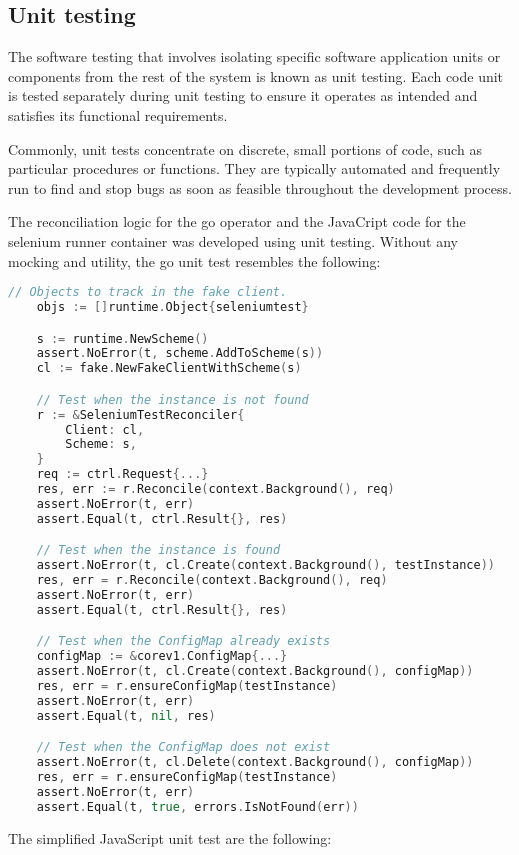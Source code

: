 \subsection{Unit testing}

The software testing that involves isolating specific software application units or components from the rest of the system is known as unit testing. Each code unit is tested separately during unit testing to ensure it operates as intended and satisfies its functional requirements.

Commonly, unit tests concentrate on discrete, small portions of code, such as particular procedures or functions. They are typically automated and frequently run to find and stop bugs as soon as feasible throughout the development process.

The reconciliation logic for the go operator and the JavaCript code for the selenium runner container was developed using unit testing. Without any mocking and utility, the go unit test resembles the following:

\begin{lstlisting}[language={Go}]
	// Objects to track in the fake client.
	objs := []runtime.Object{seleniumtest}

	s := runtime.NewScheme()
	assert.NoError(t, scheme.AddToScheme(s))
	cl := fake.NewFakeClientWithScheme(s)

	// Test when the instance is not found
	r := &SeleniumTestReconciler{
		Client: cl,
		Scheme: s,
	}
	req := ctrl.Request{...}
	res, err := r.Reconcile(context.Background(), req)
	assert.NoError(t, err)
	assert.Equal(t, ctrl.Result{}, res)

	// Test when the instance is found
	assert.NoError(t, cl.Create(context.Background(), testInstance))
	res, err = r.Reconcile(context.Background(), req)
	assert.NoError(t, err)
	assert.Equal(t, ctrl.Result{}, res)

	// Test when the ConfigMap already exists
	configMap := &corev1.ConfigMap{...}
	assert.NoError(t, cl.Create(context.Background(), configMap))
	res, err = r.ensureConfigMap(testInstance)
	assert.NoError(t, err)
	assert.Equal(t, nil, res)

	// Test when the ConfigMap does not exist
	assert.NoError(t, cl.Delete(context.Background(), configMap))
	res, err = r.ensureConfigMap(testInstance)
	assert.NoError(t, err)
	assert.Equal(t, true, errors.IsNotFound(err))
\end{lstlisting}

The simplified JavaScript unit test are the following:

